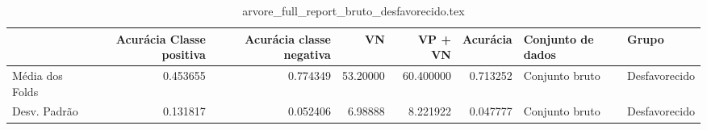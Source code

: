 \begin{table}
\centering
\caption{arvore_full_report_bruto_desfavorecido.tex}
\label{arvore_full_report_bruto_desfavorecido.tex}
\begin{tabular}{lrrrrrll}
\toprule
{}              &  Acurácia Classe positiva &  Acurácia classe negativa &       VN  &   VP + VN  &  Acurácia & Conjunto de dados &          Grupo \\
\midrule
Média dos Folds &                  0.453655 &                  0.774349 &  53.20000 &  60.400000 &  0.713252 &    Conjunto bruto &  Desfavorecido \\
Desv. Padrão    &                  0.131817 &                  0.052406 &   6.98888 &   8.221922 &  0.047777 &    Conjunto bruto &  Desfavorecido \\
\bottomrule
\end{tabular}
\end{table}
